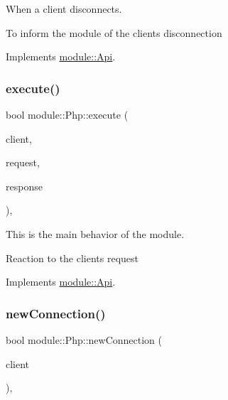 When a client disconnects. 

To inform the module of the client\textquotesingle{}s disconnection 

Implements \hyperlink{structmodule_1_1Api_a8aa98bd4094fb13916e100509a948763}{module\+::\+Api}.

\mbox{\label{classmodule_1_1Php_aa73bfe086a0015a892f7d5687639aafb}} 
\subsubsection{\texorpdfstring{execute()}{execute()}}
{\footnotesize\ttfamily bool module\+::\+Php\+::execute (\begin{DoxyParamCaption}\item[{const \hyperlink{structnet_1_1IClient}{net\+::\+I\+Client} \&}]{client,  }\item[{\hyperlink{structhttp_1_1IRequest}{http\+::\+I\+Request} \&}]{request,  }\item[{\hyperlink{structhttp_1_1IResponse}{http\+::\+I\+Response} \&}]{response }\end{DoxyParamCaption})\hspace{0.3cm}{\ttfamily [virtual]}, {\ttfamily [noexcept]}}



This is the main behavior of the module. 

Reaction to the client\textquotesingle{}s request 

Implements \hyperlink{structmodule_1_1Api_afd1f5243a90811d06d96f725490bcba6}{module\+::\+Api}.

\mbox{\label{classmodule_1_1Php_adc03ae040e0a938640bd4ba9a6eb2d3c}} 
\subsubsection{\texorpdfstring{new\+Connection()}{newConnection()}}
{\footnotesize\ttfamily bool module\+::\+Php\+::new\+Connection (\begin{DoxyParamCaption}\item[{const \hyperlink{structnet_1_1IClient}{net\+::\+I\+Client} \&}]{client }\end{DoxyParamCaption})\hspace{0.3cm}{\ttfamily [virtual]}, {\ttfamily [noexcept]}}



